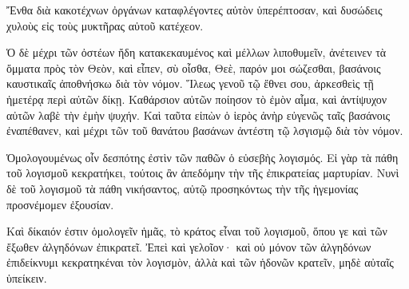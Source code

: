 {Ἔνθα διὰ κακοτέχνων ὀργάνων καταφλέγοντες αὐτὸν ὑπερέπτοσαν, καὶ δυσώδεις χυλοὺς εἰς τοὺς μυκτῆρας αὐτοῦ κατέχεον.
\par }{\PP {}Ὁ δὲ μέχρι τῶν ὀστέων ἤδη κατακεκαυμένος καὶ μέλλων λιποθυμεῖν, ἀνέτεινεν τὰ ὄμματα πρὸς τὸν Θεὸν, καὶ εἶπεν, σὺ οἶσθα, Θεὲ, παρόν μοι σώζεσθαι,
βασάνοις καυστικαῖς ἀποθνήσκω διὰ τὸν νόμον.
Ἵλεως γενοῦ τῷ ἔθνει σου, ἀρκεσθεὶς τῇ ἡμετέρᾳ περὶ αὐτῶν δίκῃ.
Καθάρσιον αὐτῶν ποίησον τὸ ἐμὸν αἷμα, καὶ ἀντίψυχον αὐτῶν λαβὲ τὴν ἐμὴν ψυχήν.
Καὶ ταῦτα εἰπὼν ὁ ἱερὸς ἀνὴρ εὐγενῶς ταῖς βασάνοις ἐναπέθανεν, καὶ μέχρι τῶν τοῦ θανάτου βασάνων ἀντέστη τῷ λσγισμῷ διὰ τὸν νόμον.
\par }{\PP {}Ὁμολογουμένως οἶν δεσπότης ἐστὶν τῶν παθῶν ὁ εὐσεβὴς λογισμός.
Εἰ γὰρ τὰ πάθη τοῦ λογισμοῦ κεκρατήκει, τούτοις ἂν ἀπεδόμην τὴν τῆς ἐπικρατείας μαρτυρίαν.
Νυνὶ δὲ τοῦ λογισμοῦ τὰ πάθη νικήσαντος, αὐτῷ προσηκόντως τὴν τῆς ἡγεμονίας προσνέμομεν ἐξουσίαν.
\par }{\PP {}Καὶ δίκαιόν ἐστιν ὁμολογεῖν ἡμᾶς, τὸ κράτος εἶναι τοῦ λογισμοῦ, ὅπου γε καὶ τῶν ἔξωθεν ἀλγηδόνων ἐπικρατεῖ.
Ἐπεὶ καὶ γελοῖον· καὶ οὐ μόνον τῶν ἀλγηδόνων ἐπιδείκνυμι κεκρατηκέναι τὸν λογισμὸν, ἀλλὰ καὶ τῶν ἡδονῶν κρατεῖν, μηδὲ αὐταῖς ὑπείκειν.

}
